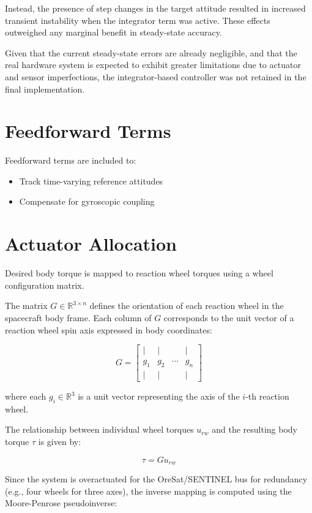 Instead, the presence of step changes in the target attitude resulted in increased transient instability when the integrator term was active. These effects outweighed any marginal benefit in steady-state accuracy.

Given that the current steady-state errors are already negligible, and that the real hardware system is expected to exhibit greater limitations due to actuator and sensor imperfections, the integrator-based controller was not retained in the final implementation.

\section{Feedforward Terms}

Feedforward terms are included to:

\begin{itemize}
	\item Track time-varying reference attitudes
	\item Compensate for gyroscopic coupling
\end{itemize}

\section{Actuator Allocation}

Desired body torque is mapped to reaction wheel torques using a wheel configuration matrix.

The matrix $G \in \mathbb{R}^{3 \times n}$ defines the orientation of each reaction wheel in the spacecraft body frame. Each column of $G$ corresponds to the unit vector of a reaction wheel spin axis expressed in body coordinates:

\[
G =
\begin{bmatrix}
	| & | &        & | \\
	g_1 & g_2 & \cdots & g_n \\
	| & | &        & |
\end{bmatrix}
\]

where each $g_i \in \mathbb{R}^3$ is a unit vector representing the axis of the $i$-th reaction wheel.

The relationship between individual wheel torques $u_{rw}$ and the resulting body torque $\tau$ is given by:

\[
\tau = G u_{rw}
\]

Since the system is overactuated for the OreSat/SENTINEL bus for redundancy (e.g., four wheels for three axes), the inverse mapping is computed using the Moore-Penrose pseudoinverse:

